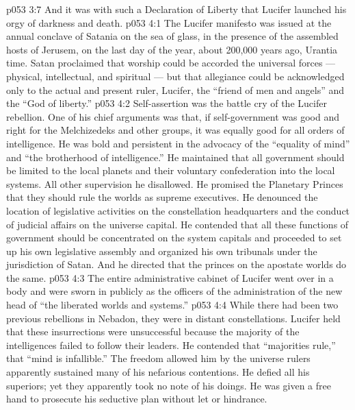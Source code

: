 \vs p053 3:7 \pc And it was with such a Declaration of Liberty that Lucifer launched his orgy of darkness and death.
\vs p053 4:1 The Lucifer manifesto was issued at the annual conclave of Satania on the sea of glass, in the presence of the assembled hosts of Jerusem, on the last day of the year, about 200,000 years ago, Urantia time. Satan proclaimed that worship could be accorded the universal forces --- physical, intellectual, and spiritual --- but that allegiance could be acknowledged only to the actual and present ruler, Lucifer, the “friend of men and angels” and the “God of liberty.”
\vs p053 4:2 Self\hyp{}assertion was the battle cry of the Lucifer rebellion. One of his chief arguments was that, if self\hyp{}government was good and right for the Melchizedeks and other groups, it was equally good for all orders of intelligence. He was bold and persistent in the advocacy of the “equality of mind” and “the brotherhood of intelligence.” He maintained that all government should be limited to the local planets and their voluntary confederation into the local systems. All other supervision he disallowed. He promised the Planetary Princes that they should rule the worlds as supreme executives. He denounced the location of legislative activities on the constellation headquarters and the conduct of judicial affairs on the universe capital. He contended that all these functions of government should be concentrated on the system capitals and proceeded to set up his own legislative assembly and organized his own tribunals under the jurisdiction of Satan. And he directed that the princes on the apostate worlds do the same.
\vs p053 4:3 The entire administrative cabinet of Lucifer went over in a body and were sworn in publicly as the officers of the administration of the new head of “the liberated worlds and systems.”
\vs p053 4:4 \pc While there had been two previous rebellions in Nebadon, they were in distant constellations. Lucifer held that these insurrections were unsuccessful because the majority of the intelligences failed to follow their leaders. He contended that “majorities rule,” that “mind is infallible.” The freedom allowed him by the universe rulers apparently sustained many of his nefarious contentions. He defied all his superiors; yet they apparently took no note of his doings. He was given a free hand to prosecute his seductive plan without let or hindrance.
